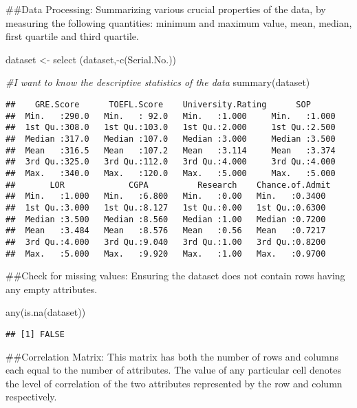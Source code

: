 \documentclass[
]{article}
\newenvironment{Shaded}{\begin{snugshade}}{\end{snugshade}}
\newcommand{\CommentTok}[1]{\textcolor[rgb]{0.56,0.35,0.01}{\textit{#1}}}
\newcommand{\FunctionTok}[1]{\textcolor[rgb]{0.00,0.00,0.00}{#1}}
\newcommand{\NormalTok}[1]{#1}
\newcommand{\OtherTok}[1]{\textcolor[rgb]{0.56,0.35,0.01}{#1}}
\newcommand{\SpecialCharTok}[1]{\textcolor[rgb]{0.00,0.00,0.00}{#1}}
\begin{document}
\#\#Data Processing: Summarizing various crucial properties of the data,
by measuring the following quantities: minimum and maximum value, mean,
median, first quartile and third quartile.

\begin{Shaded}
\begin{Highlighting}[]
\NormalTok{dataset }\OtherTok{\textless{}{-}} \FunctionTok{select}\NormalTok{ (dataset,}\SpecialCharTok{{-}}\FunctionTok{c}\NormalTok{(Serial.No.))}

\CommentTok{\#I want to know the descriptive statistics of the data}
\FunctionTok{summary}\NormalTok{(dataset)}
\end{Highlighting}
\end{Shaded}

\begin{verbatim}
##    GRE.Score      TOEFL.Score    University.Rating      SOP       
##  Min.   :290.0   Min.   : 92.0   Min.   :1.000     Min.   :1.000  
##  1st Qu.:308.0   1st Qu.:103.0   1st Qu.:2.000     1st Qu.:2.500  
##  Median :317.0   Median :107.0   Median :3.000     Median :3.500  
##  Mean   :316.5   Mean   :107.2   Mean   :3.114     Mean   :3.374  
##  3rd Qu.:325.0   3rd Qu.:112.0   3rd Qu.:4.000     3rd Qu.:4.000  
##  Max.   :340.0   Max.   :120.0   Max.   :5.000     Max.   :5.000  
##       LOR             CGPA          Research    Chance.of.Admit 
##  Min.   :1.000   Min.   :6.800   Min.   :0.00   Min.   :0.3400  
##  1st Qu.:3.000   1st Qu.:8.127   1st Qu.:0.00   1st Qu.:0.6300  
##  Median :3.500   Median :8.560   Median :1.00   Median :0.7200  
##  Mean   :3.484   Mean   :8.576   Mean   :0.56   Mean   :0.7217  
##  3rd Qu.:4.000   3rd Qu.:9.040   3rd Qu.:1.00   3rd Qu.:0.8200  
##  Max.   :5.000   Max.   :9.920   Max.   :1.00   Max.   :0.9700
\end{verbatim}

\#\#Check for missing values: Ensuring the dataset does not contain rows
having any empty attributes.

\begin{Shaded}
\begin{Highlighting}[]
\FunctionTok{any}\NormalTok{(}\FunctionTok{is.na}\NormalTok{(dataset))}
\end{Highlighting}
\end{Shaded}

\begin{verbatim}
## [1] FALSE
\end{verbatim}

\#\#Correlation Matrix: This matrix has both the number of rows and
columns each equal to the number of attributes. The value of any
particular cell denotes the level of correlation of the two attributes
represented by the row and column respectively.
\end{document}
